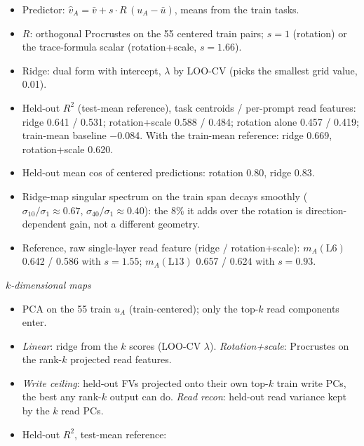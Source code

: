 \documentclass{article}
\renewcommand{\_}{\textunderscore\allowbreak}
\providecommand{\tightlist}{\setlength{\itemsep}{0pt}\setlength{\parskip}{0pt}}
\begin{document}
\begin{itemize}
\tightlist
\item
  Predictor: \(\hat v_A = \bar v + s \cdot R\,(u_A - \bar u)\), means from the train tasks.
\item
  \(R\): orthogonal Procrustes on the 55 centered train pairs; \(s = 1\) (rotation) or the trace-formula scalar (rotation+scale, \(s = 1.66\)).
\item
  Ridge: dual form with intercept, \(\lambda\) by LOO-CV (picks the smallest grid value, 0.01).
\item
  Held-out \(R^2\) (test-mean reference), task centroids / per-prompt read features: ridge 0.641 / 0.531; rotation+scale 0.588 / 0.484; rotation alone 0.457 / 0.419; train-mean baseline −0.084. With the train-mean reference: ridge 0.669, rotation+scale 0.620.
\item
  Held-out mean cos of centered predictions: rotation 0.80, ridge 0.83.
\item
  Ridge-map singular spectrum on the train span decays smoothly (\(\sigma_{10}/\sigma_1 \approx
  0.67\), \(\sigma_{40}/\sigma_1 \approx 0.40\)): the 8\% it adds over the rotation is direction-dependent gain, not a different geometry.
\item
  Reference, raw single-layer read feature (ridge / rotation+scale): \(m_A(\mathrm{L6})\) 0.642 / 0.586 with \(s = 1.55\); \(m_A(\mathrm{L13})\) 0.657 / 0.624 with \(s = 0.93\).
\end{itemize}

\emph{\(k\)-dimensional maps}

\begin{itemize}
\tightlist
\item
  PCA on the 55 train \(u_A\) (train-centered); only the top-\(k\) read components enter.
\item
  \emph{Linear}: ridge from the \(k\) scores (LOO-CV \(\lambda\)). \emph{Rotation+scale}: Procrustes on the rank-\(k\) projected read features.
\item
  \emph{Write ceiling}: held-out FVs projected onto their own top-\(k\) train write PCs, the best any rank-\(k\) output can do. \emph{Read recon}: held-out read variance kept by the \(k\) read PCs.
\item
  Held-out \(R^2\), test-mean reference:
\end{itemize}
\end{document}
